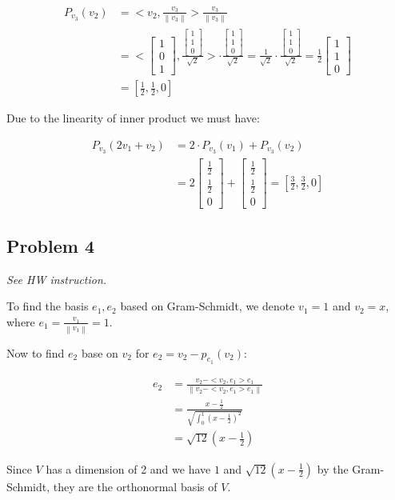 \documentclass[11pt]{article}
\providecommand{\qbm}[1]{\begin{bmatrix} #1 \end{bmatrix}}
\providecommand{\norm}[1]{\left\lVert #1 \right\rVert}
\begin{document}
\begin{align*}
    P_{v_3}(v_2) &= < v_2, \frac{v_3}{\norm{v_3}} > \frac{v_3}{\norm{v_3}} \\
    &= < \qbm{1 \\ 0 \\ 1}, \frac{\qbm{1 \\ 1 \\ 0}}{\sqrt{2}} > \cdot \frac{\qbm{1 \\ 1 \\ 0}}{\sqrt{2}} = \frac{1}{\sqrt{2}} \cdot \frac{\qbm{1 \\ 1 \\ 0}}{\sqrt{2}} = \frac{1}{2} \qbm{1 \\ 1 \\ 0} \\
    &= [\frac{1}{2}, \frac{1}{2}, 0]
\end{align*}

Due to the linearity of inner product we must have:

\begin{align*}
    P_{v_3}(2 v_1 + v_2) &= 2 \cdot P_{v_3}(v_1) + P_{v_3}(v_2) \\
    &= 2 \qbm{\frac{1}{2} \\ \frac{1}{2} \\ 0} +  \qbm{\frac{1}{2} \\ \frac{1}{2} \\ 0 } = [\frac{3}{2}, \frac{3}{2}, 0]
\end{align*}

\subsection*{Problem 4}
\textit{See HW instruction.}\newline

To find the basis $e_1, e_2$ based on Gram-Schmidt, we denote $v_1 = 1$ and $v_2 = x$, where $e_1 = \frac{v_1}{\norm{v_1}} = 1$.

Now to find $e_2$ base on $v_2$ for $e_2 = v_2 - p_{e_1}(v_2)$:


\begin{align*}
    e_2 &= \frac{ v_2 - <v_2, e_1> e_1}{\norm{ v_2 - <v_2, e_1> e_1}} \\
    &= \frac{x - \frac{1}{2}}{\sqrt{\int_{0}^{1} (x - \frac{1}{2})^2}} \\
    &= \sqrt{12}(x - \frac{1}{2})
\end{align*}

Since $V$ has a dimension of 2 and we have $1$ and $\sqrt{12}(x - \frac{1}{2})$ by the Gram-Schmidt, they are the orthonormal basis of $V$.
\end{document}
